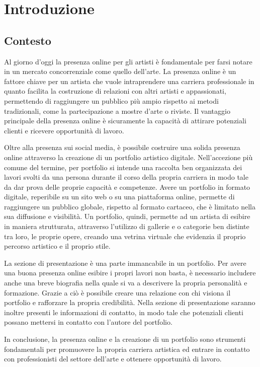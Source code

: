 \chapter{Introduzione}\label{cap:introduzione}
\section{Contesto}\label{sez:contesto}
Al giorno d'oggi la presenza online per gli artisti \`e fondamentale per farsi notare in un mercato concorrenziale come quello dell'arte. La presenza online \`e un fattore chiave per un artista che vuole intraprendere una carriera professionale in quanto facilita la costruzione di relazioni con altri artisti e appassionati, permettendo di raggiungere un pubblico pi\`u ampio rispetto ai metodi  tradizionali, come la partecipazione a mostre d'arte o riviste. Il vantaggio principale della presenza online \`e sicuramente la capacit\`a di attirare potenziali clienti e ricevere opportunit\`a di lavoro.

Oltre alla presenza sui social media, \`e possibile costruire una solida presenza online attraverso la creazione di un portfolio artistico digitale. Nell'accezione pi\`u comune del termine, per portfolio si intende una raccolta ben organizzata dei lavori svolti da una persona durante il corso della propria carriera in modo tale da dar prova delle proprie capacit\`a e competenze.
Avere un portfolio in formato digitale, reperibile su un sito web o su una piattaforma online, permette di raggiungere un pubblico globale, rispetto al formato cartaceo, che \`e limitato nella sua diffusione e visibilit\`a. Un portfolio, quindi, permette ad un artista di esibire in maniera strutturata, attraverso l'utilizzo di gallerie e o categorie ben distinte tra loro, le proprie opere, creando una vetrina virtuale che evidenzia il proprio percorso artistico e il proprio stile.

La sezione di presentazione \`e una parte immancabile in un portfolio. Per avere una buona presenza online esibire i propri lavori non basta, \`e necessario includere anche una breve biografia nella quale si va a descrivere la propria personalit\`a e formazione. Grazie a ci\`o \`e possibile creare una relazione con chi visiona il portfolio e rafforzare la propria credibilit\`a. Nella sezione di presentazione saranno inoltre presenti le informazioni di contatto, in modo tale che potenziali clienti possano mettersi in contatto con l'autore del portfolio.

In conclusione, la presenza online e la creazione di un portfolio sono strumenti fondamentali per promuovere la propria carriera artistica ed entrare in contatto con professionisti del settore dell'arte e ottenere opportunit\`a di lavoro.

